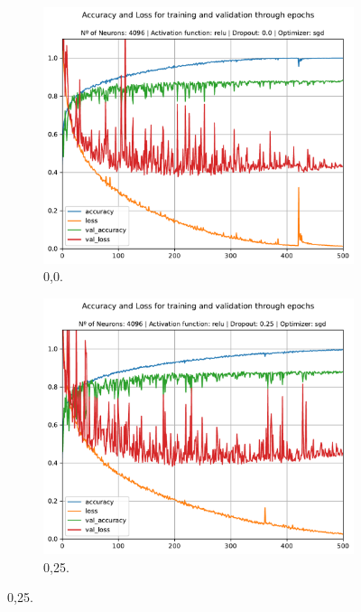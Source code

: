 \begin{figure}[H]
	\centering
	\begin{subfigure}[H]{0.49\textwidth}
		\includegraphics[width = \textwidth]{../../plot/mlp/mlp_4096_relu_0.0_sgd}
		\caption{0,0.}
		\label{fig:mlp_4096_relu_0.0_sgd_dropout}
	\end{subfigure}
	\begin{subfigure}[H]{0.49\textwidth}
		\centering
		\includegraphics[width = \textwidth]{../../plot/mlp/mlp_4096_relu_0.25_sgd}
		\caption{0,25.}
		\label{fig:mlp_4096_relu_0.25_sgd}
	\end{subfigure}

\end{figure}
